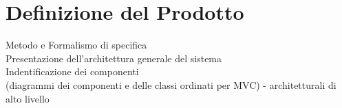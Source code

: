 \section{Definizione del Prodotto}
Metodo e Formalismo di specifica \\
Presentazione dell'architettura generale del sistema \\
Indentificazione dei componenti\\
(diagrammi dei componenti e delle classi ordinati per MVC)
- architetturali di alto livello

